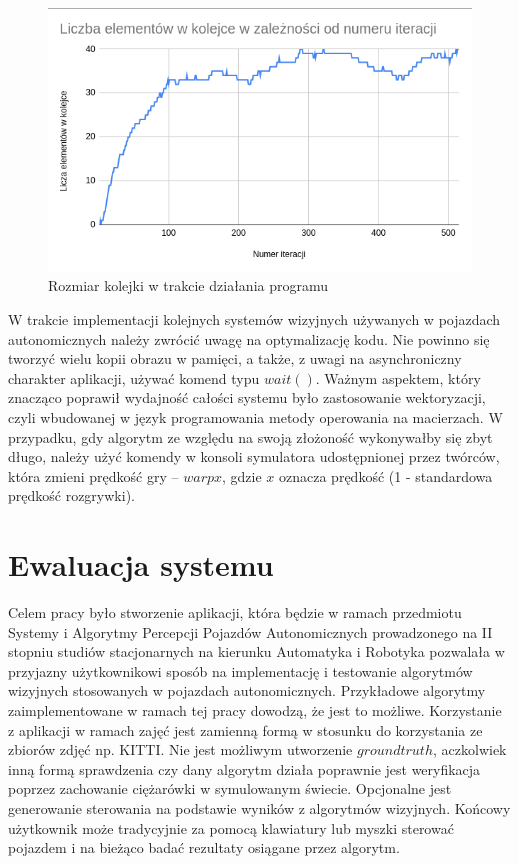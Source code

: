 \begin{figure}
  \centering
  \includegraphics[width=13cm]{img/queue_stats.png}
  \caption{Rozmiar kolejki w trakcie działania programu}
  \label{fig:queue_stats}
\end{figure}

W trakcie implementacji kolejnych systemów wizyjnych używanych w pojazdach autonomicznych należy zwrócić uwagę na optymalizację kodu. 
Nie powinno się tworzyć wielu kopii obrazu w pamięci, a także, z uwagi na asynchroniczny charakter aplikacji,  używać komend typu $wait()$. 
Ważnym aspektem, który znacząco poprawił wydajność całości systemu było zastosowanie wektoryzacji, czyli wbudowanej w język programowania metody operowania na macierzach. 
W przypadku, gdy algorytm ze względu na swoją złożoność wykonywałby się zbyt długo, należy użyć komendy w konsoli symulatora udostępnionej przez twórców, która zmieni prędkość gry -- $warp x$, gdzie $x$ oznacza prędkość (1 - standardowa prędkość rozgrywki).

\section{Ewaluacja systemu}

Celem pracy było stworzenie aplikacji, która będzie w ramach przedmiotu Systemy i Algorytmy Percepcji Pojazdów Autonomicznych prowadzonego na II stopniu studiów stacjonarnych na kierunku Automatyka i Robotyka pozwalała w przyjazny użytkownikowi sposób na implementację i testowanie algorytmów wizyjnych stosowanych w pojazdach autonomicznych. 
Przykładowe algorytmy zaimplementowane w ramach tej pracy dowodzą, że jest to możliwe. 
Korzystanie z aplikacji w ramach zajęć jest zamienną formą w stosunku do korzystania ze zbiorów zdjęć np. KITTI. %
Nie jest możliwym utworzenie $groundtruth$, aczkolwiek inną formą sprawdzenia czy dany algorytm działa poprawnie jest weryfikacja poprzez zachowanie ciężarówki w symulowanym świecie. %
Opcjonalne jest generowanie sterowania na podstawie wyników z algorytmów wizyjnych. 
Końcowy użytkownik może tradycyjnie za pomocą klawiatury lub myszki sterować pojazdem i na bieżąco badać rezultaty osiągane przez algorytm.

